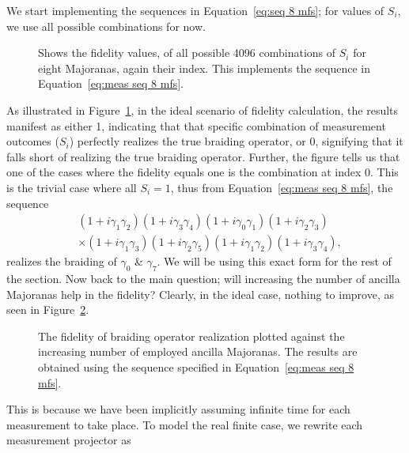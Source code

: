 \documentclass{article}
\begin{document}
\vspace{12pt}
We start implementing the sequences in Equation~\ref{eq:seq 8 mfs}; for values of $ S_i $, we use all possible combinations for now.
\begin{figure}
	\begin{center}
		
	\end{center}
	\caption{Shows the fidelity values, of all possible 4096 combinations of $ S_i $ for eight Majoranas, again their index. This implements the sequence in Equation~\ref{eq:meas seq 8 mfs}.}
	\label{fig:ideal fids all combs}
\end{figure}
As illustrated in Figure~\ref{fig:ideal fids all combs}, in the ideal scenario of fidelity calculation, the results manifest as either 1, indicating that that specific combination of measurement outcomes ($ S_i $) perfectly realizes the true braiding operator, or 0, signifying that it falls short of realizing the true braiding operator. Further, the figure tells us that one of the cases where the fidelity equals one is the combination at index 0. This is the trivial case where all $ S_i=1 $, thus from Equation~\ref{eq:meas seq 8 mfs}, the sequence
\[
	\begin{aligned}
		 & (1+ i \gamma_1 \gamma_2)(1+ i \gamma_3 \gamma_4)(1+ i \gamma_0 \gamma_1) (1+ i \gamma_2 \gamma_3)        \\
		 & \times (1+ i \gamma_1 \gamma_3)(1+ i \gamma_2 \gamma_5)(1+ i \gamma_1 \gamma_2)(1+ i \gamma_3 \gamma_4),
	\end{aligned}
\]
realizes the braiding of $ \gamma_0 $ \& $ \gamma_7 $. We will be using this exact form for the rest of the section. Now back to the main question; will increasing the number of ancilla Majoranas help in the fidelity? Clearly, in the ideal case, nothing to improve, as seen in Figure~\ref{fig:fid vs N ideal}.
\begin{figure}
	\begin{center}
		
	\end{center}
	\caption{The fidelity of braiding operator realization plotted against the increasing number of employed ancilla Majoranas. The results are obtained using the sequence specified in Equation~\ref{eq:meas seq 8 mfs}.}
	\label{fig:fid vs N ideal}
\end{figure}
This is because we have been implicitly assuming infinite time for each measurement to take place. To model the real finite case, we rewrite each measurement projector as
\end{document}
